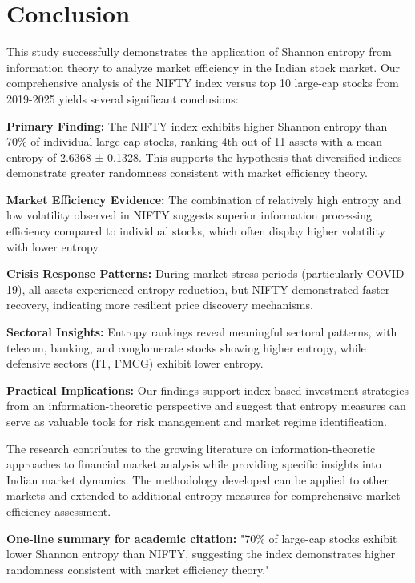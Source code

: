\documentclass[12pt,a4paper]{article}
\begin{document}
\section{Conclusion}

This study successfully demonstrates the application of Shannon entropy from information theory to analyze market efficiency in the Indian stock market. Our comprehensive analysis of the NIFTY index versus top 10 large-cap stocks from 2019-2025 yields several significant conclusions:

\textbf{Primary Finding:} The NIFTY index exhibits higher Shannon entropy than 70\% of individual large-cap stocks, ranking 4th out of 11 assets with a mean entropy of 2.6368 ± 0.1328. This supports the hypothesis that diversified indices demonstrate greater randomness consistent with market efficiency theory.

\textbf{Market Efficiency Evidence:} The combination of relatively high entropy and low volatility observed in NIFTY suggests superior information processing efficiency compared to individual stocks, which often display higher volatility with lower entropy.

\textbf{Crisis Response Patterns:} During market stress periods (particularly COVID-19), all assets experienced entropy reduction, but NIFTY demonstrated faster recovery, indicating more resilient price discovery mechanisms.

\textbf{Sectoral Insights:} Entropy rankings reveal meaningful sectoral patterns, with telecom, banking, and conglomerate stocks showing higher entropy, while defensive sectors (IT, FMCG) exhibit lower entropy.

\textbf{Practical Implications:} Our findings support index-based investment strategies from an information-theoretic perspective and suggest that entropy measures can serve as valuable tools for risk management and market regime identification.

The research contributes to the growing literature on information-theoretic approaches to financial market analysis while providing specific insights into Indian market dynamics. The methodology developed can be applied to other markets and extended to additional entropy measures for comprehensive market efficiency assessment.

\textbf{One-line summary for academic citation:} "70\% of large-cap stocks exhibit lower Shannon entropy than NIFTY, suggesting the index demonstrates higher randomness consistent with market efficiency theory."
\end{document}
